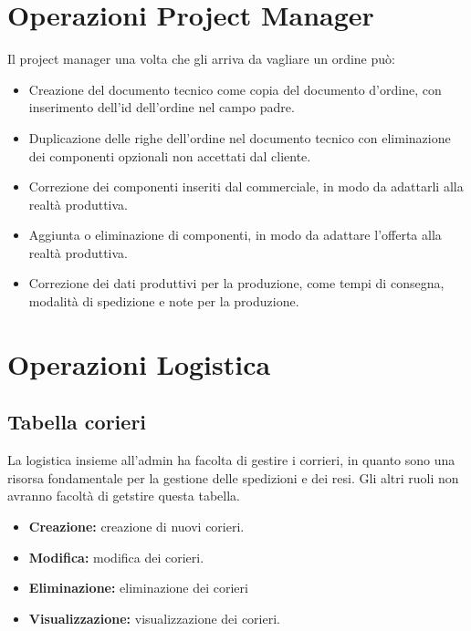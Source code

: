\documentclass[12pt, a4paper]{article}
\begin{document}
\section{Operazioni Project Manager}
Il project manager una volta che gli arriva da vagliare un ordine può:
\begin{itemize}
    \item Creazione del documento tecnico come copia del documento d'ordine, con inserimento dell'id dell'ordine nel campo padre.
    \item Duplicazione delle righe dell'ordine nel documento tecnico con eliminazione dei componenti opzionali non accettati dal cliente.
    \item Correzione dei componenti inseriti dal commerciale, in modo da adattarli alla realtà produttiva.
    \item Aggiunta o eliminazione di componenti, in modo da adattare l'offerta alla realtà produttiva.
    \item Correzione dei dati produttivi per la produzione, come tempi di consegna, modalità di spedizione e note per la produzione.
\end{itemize}

\section{Operazioni Logistica}
\subsection{Tabella corieri}
La logistica insieme all'admin ha facolta di gestire i corrieri, in quanto sono una risorsa fondamentale per la gestione delle spedizioni e dei resi.
Gli altri ruoli non avranno facoltà di getstire questa tabella.
\begin{itemize}
    \item \textbf{Creazione:} creazione di nuovi corieri.
    \item \textbf{Modifica:} modifica dei corieri.
    \item \textbf{Eliminazione:} eliminazione dei corieri
    \item \textbf{Visualizzazione:} visualizzazione dei corieri.
\end{itemize}
\end{document}
